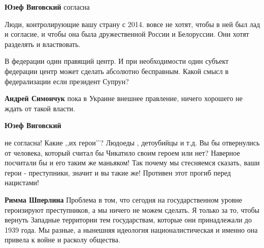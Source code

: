 \begin{itemize}
 
\textbf{Юзеф Виговский} согласна


Люди, контролирующие вашу страну с 2014. вовсе не хотят, чтобы в ней был лад и
согласие, и чтобы она была дружественной России и Белоруссии. Они хотят
разделять и властвовать.


В федерации один правящий центр. И при необходимости один субъект федерации
центр может сделать абсолютно бесправным. Какой смысл в федерализации если
президент Супрун?


\textbf{Андрей Симончук} пока в Украине внешнее правление, ничего хорошего не ждать от такой власти.


\textbf{Юзеф Виговский} 

не согласна! Какие ,,их герои’’? Людоеды , детоубийцы и т.д. Вы бы отвернулись
от человека, который считал бы Чикатило своим героем или нет? Наверное
посчитали бы и его таким же маньяком! Так почему мы стесняемся сказать, ваши
герои - преступники, значит и вы такие же! Противен этот прогиб перед нацистами!


\textbf{Римма Шперлина} Проблема в том, что сегодня на государственном уровне
героизируют преступников, а мы ничего не можем сделать. Я только за то, чтобы
вернуть Западные территории тем государствам, которые они принадлежали до 1939
года. Мы разные, а нынешняя идеология националистическая и именно она привела к
войне и расколу общества.


\end{itemize}
